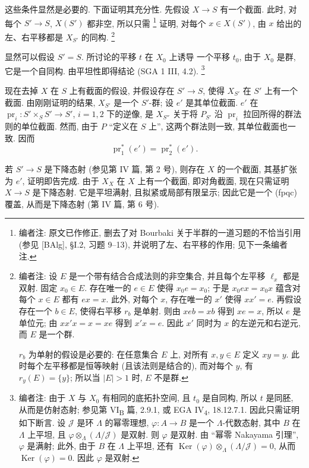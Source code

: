 这些条件显然是必要的. 下面证明其充分性.
先假设 \(X\to S\) 有一个截面.
此时, 对每个 \(S'\to S\), \(X(S')\) 都非空, 所以只需
\footnote{编者注: 原文已作修正, 删去了对 Bourbaki 关于半群的一道习题的不恰当引用
(参见 [BAlg], \S I.2, 习题 9--13), 并说明了左、右平移的作用;
见下一条编者注.}
证明, 对每个 \(x\in X(S')\), 由 \(x\) 给出的左、右平移都是
\(X_{S'}\) 的同构.
\footnote{编者注: 设 \(E\) 是一个带有结合合成法则的非空集合,
并且每个左平移 \(\ell_x\) 都是双射. 固定 \(x_0\in E\).
存在唯一的 \(e\in E\) 使得 \(x_0e=x_0\);
于是 \(x_0ex=x_0x\) 蕴含对每个 \(x\in E\) 都有 \(ex=x\).
此外, 对每个 \(x\), 存在唯一的 \(x'\) 使得 \(xx'=e\).
再假设存在一个 \(b\in E\), 使得右平移 \(r_b\) 是单射.
则由 \(xeb=xb\) 得到 \(xe=x\), 所以 \(e\) 是单位元;
由 \(xx'x=x=xe\) 得到 \(x'x=e\). 因此 \(x'\) 同时为 \(x\)
的左逆元和右逆元, 而 \(E\) 是一个群.

\(r_b\) 为单射的假设是必要的: 在任意集合 \(E\) 上,
对所有 \(x,y\in E\) 定义 \(xy=y\).
此时每个左平移都是恒等映射 (且该法则是结合的),
而对每个 \(y\), 有 \(r_y(E)=\{y\}\);
所以当 \(|E|>1\) 时, \(E\) 不是群.}

显然可以假设 \(S'=S\). 所讨论的平移 \(t\) 在 \(X_0\) 上诱导
一个平移 \(t_0\), 由于 \(X_0\) 是群, 它是一个自同构.
由平坦性即得结论 (SGA 1 III, 4.2).
\footnote{编者注: 由于 \(X\) 与 \(X_0\) 有相同的底拓扑空间,
且 \(t_0\) 是自同构, 所以 \(t\) 是同胚, 从而是仿射态射;
参见第 VI\textsubscript{B} 篇, 2.9.1, 或 EGA IV\textsubscript{4}, 18.12.7.1.
因此只需证明如下断言. 设 \(\mathscr J\) 是环 \(\Lambda\) 的幂零理想,
\(\varphi:A\to B\) 是一个 \(\Lambda\)-代数态射,
其中 \(B\) 在 \(\Lambda\) 上平坦,
且 \(\varphi\otimes_\Lambda(\Lambda/\mathscr J)\) 是双射.
则 \(\varphi\) 是双射. 由 ``幂零 Nakayama 引理'',
\(\varphi\) 是满射; 此外, 由于 \(B\) 在 \(\Lambda\) 上平坦,
还有 \(\operatorname{Ker}(\varphi)\otimes_\Lambda
(\Lambda/\mathscr J)=0\), 从而
\(\operatorname{Ker}(\varphi)=0\). 因此 \(\varphi\) 是双射.}

现在去掉 \(X\) 在 \(S\) 上有截面的假设,
并假设存在 \(S'\to S\), 使得 \(X_{S'}\) 在 \(S'\) 上有一个截面.
由刚刚证明的结果, \(X_{S'}\) 是一个 \(S'\)-群;
设 \(e'\) 是其单位截面.
\(e'\) 在 \(\operatorname{pr}_i:S'\times_S S'\to S'\), \(i=1,2\)
下的逆像, 是 \(X_{S''}\) 关于将 \(P_{S'}\) 沿
\(\operatorname{pr}_i\) 拉回所得的群法则的单位截面.
然而, 由于 \(P\) ``定义在 \(S\) 上'', 这两个群法则一致,
其单位截面也一致. 因而
\[
 \operatorname{pr}_1^*(e')=\operatorname{pr}_2^*(e').
\]

若 \(S'\to S\) 是下降态射 (参见第 IV 篇, 第 2 号),
则存在 \(X\) 的一个截面, 其基扩张为 \(e'\), 证明即告完成.
由于 \(X_X\) 在 \(X\) 上有一个截面, 即对角截面,
现在只需证明 \(X\to S\) 是下降态射.
它是平坦满射, 且拟紧或局部有限呈示;
因此它是一个 (fpqc) 覆盖, 从而是下降态射 (第 IV 篇, 第 6 号).

